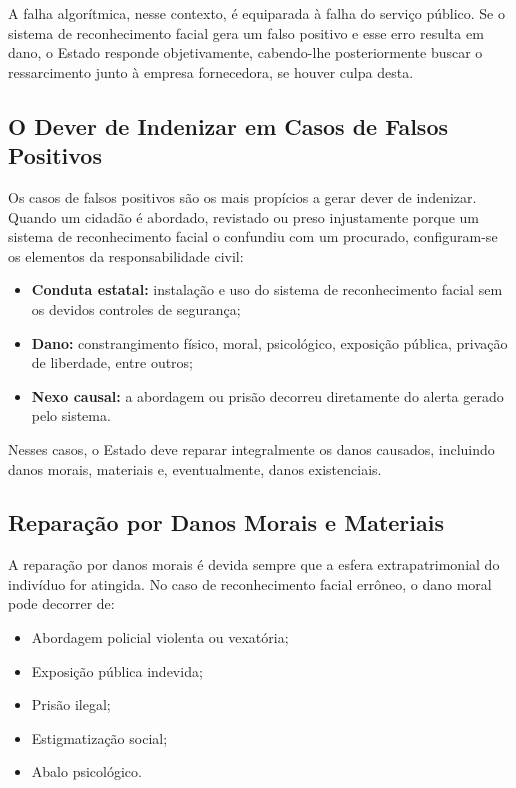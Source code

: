 \documentclass[12pt,a4paper]{article}
\begin{document}
A falha algorítmica, nesse contexto, é equiparada à falha do serviço público. Se o sistema de reconhecimento facial gera um falso positivo e esse erro resulta em dano, o Estado responde objetivamente, cabendo-lhe posteriormente buscar o ressarcimento junto à empresa fornecedora, se houver culpa desta.

\subsection{O Dever de Indenizar em Casos de Falsos Positivos}

Os casos de falsos positivos são os mais propícios a gerar dever de indenizar. Quando um cidadão é abordado, revistado ou preso injustamente porque um sistema de reconhecimento facial o confundiu com um procurado, configuram-se os elementos da responsabilidade civil:

\begin{itemize}
    \item \textbf{Conduta estatal:} instalação e uso do sistema de reconhecimento facial sem os devidos controles de segurança;
    \item \textbf{Dano:} constrangimento físico, moral, psicológico, exposição pública, privação de liberdade, entre outros;
    \item \textbf{Nexo causal:} a abordagem ou prisão decorreu diretamente do alerta gerado pelo sistema.
\end{itemize}

Nesses casos, o Estado deve reparar integralmente os danos causados, incluindo danos morais, materiais e, eventualmente, danos existenciais.

\subsection{Reparação por Danos Morais e Materiais}

A reparação por danos morais é devida sempre que a esfera extrapatrimonial do indivíduo for atingida. No caso de reconhecimento facial errôneo, o dano moral pode decorrer de:

\begin{itemize}
    \item Abordagem policial violenta ou vexatória;
    \item Exposição pública indevida;
    \item Prisão ilegal;
    \item Estigmatização social;
    \item Abalo psicológico.
\end{itemize}
\end{document}
